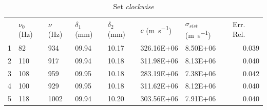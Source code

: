 \documentclass[a4paper,11pt]{article}
\begin{document}
	\begin{table}[htbp]
		\centering
		\caption{Set \emph{clockwise}}
		\vspace{0.1cm}
		\begin{tabular}{rllllllr}
			\rowcolor[rgb]{ .741,  .843,  .933} \multicolumn{1}{l}{Indice} & $\nu_0$ (\si{\hertz}) & $\nu$ (\si{\hertz}) & $\delta_1$ (\si{\milli\meter}) & $\delta_2$ (\si{\milli\meter}) & $c$ (\si{\meter\per\second}) & $\sigma_{sist}$ (\si{\meter\per\second}) & \multicolumn{1}{l}{Err. Rel.} \\
			\rowcolor[rgb]{ .741,  .843,  .933} 1     & \cellcolor[rgb]{ .859,  .859,  .859} \num{82} & \cellcolor[rgb]{ .859,  .859,  .859} \num{934} & \cellcolor[rgb]{ .859,  .859,  .859} \num{09.94} & \cellcolor[rgb]{ .859,  .859,  .859} \num{10.17} & \cellcolor[rgb]{ .859,  .859,  .859} \num{326.16E+06} & \cellcolor[rgb]{ .859,  .859,  .859} \num{8.50E+06} & \cellcolor[rgb]{ .859,  .859,  .859} 0.039 \\
			\rowcolor[rgb]{ .741,  .843,  .933} 2     & \cellcolor[rgb]{ .929,  .929,  .929} \num{110} & \cellcolor[rgb]{ .929,  .929,  .929} \num{917} & \cellcolor[rgb]{ .929,  .929,  .929} \num{09.94} & \cellcolor[rgb]{ .929,  .929,  .929} \num{10.18} & \cellcolor[rgb]{ .929,  .929,  .929} \num{311.98E+06} & \cellcolor[rgb]{ .929,  .929,  .929} \num{8.13E+06} & \cellcolor[rgb]{ .929,  .929,  .929} 0.040 \\
			\rowcolor[rgb]{ .741,  .843,  .933} 3     & \cellcolor[rgb]{ .859,  .859,  .859} \num{108} & \cellcolor[rgb]{ .859,  .859,  .859} \num{959} & \cellcolor[rgb]{ .859,  .859,  .859} \num{09.95} & \cellcolor[rgb]{ .859,  .859,  .859} \num{10.18} & \cellcolor[rgb]{ .859,  .859,  .859} \num{283.19E+06} & \cellcolor[rgb]{ .859,  .859,  .859} \num{7.38E+06} & \cellcolor[rgb]{ .859,  .859,  .859} 0.042 \\
			\rowcolor[rgb]{ .741,  .843,  .933} 4     & \cellcolor[rgb]{ .929,  .929,  .929} \num{100} & \cellcolor[rgb]{ .929,  .929,  .929} \num{929} & \cellcolor[rgb]{ .929,  .929,  .929} \num{09.95} & \cellcolor[rgb]{ .929,  .929,  .929} \num{10.18} & \cellcolor[rgb]{ .929,  .929,  .929} \num{311.62E+06} & \cellcolor[rgb]{ .929,  .929,  .929} \num{8.12E+06} & \cellcolor[rgb]{ .929,  .929,  .929} 0.040 \\
			\rowcolor[rgb]{ .741,  .843,  .933} 5     & \cellcolor[rgb]{ .859,  .859,  .859} \num{118} & \cellcolor[rgb]{ .859,  .859,  .859} \num{1002} & \cellcolor[rgb]{ .859,  .859,  .859} \num{09.94} & \cellcolor[rgb]{ .859,  .859,  .859} \num{10.20} & \cellcolor[rgb]{ .859,  .859,  .859} \num{303.56E+06} & \cellcolor[rgb]{ .859,  .859,  .859} \num{7.91E+06} & \cellcolor[rgb]{ .859,  .859,  .859} 0.040 \\

\end{tabular}
\end{table}
\end{document}

